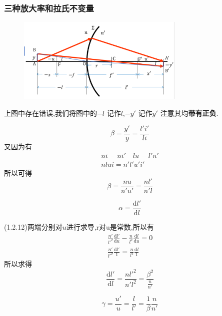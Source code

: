 \subsubsection{三种放大率和拉氏不变量}
        \begin{figure}[H]
            \centering
            \includegraphics[width=8cm]{img/1.3.png}
            \end{figure}
上图中存在错误,我们将图中的$-l$ 记作$l$,$-y'$ 记作$y'$ 注意其均\textbf{带有正负}.
\begin{description}[leftmargin=0.7cm,style=nextline,nosep]%
    \item[横向放大率] 
     \begin{equation}
     \beta=\frac{y'}{y}=\frac{l'i'}{li}\tag{1.2.20}
     \end{equation}
     又因为有
\begin{align}
    ni=ni' \quad lu=l'u' \tag{1.2.21.bre 1}\\
        nlui=n'l'u'i'  \tag{1.2.21.bre 2}
\end{align}
所以可得
\begin{equation}
\beta=\frac{nu}{n'u'}=\frac{nl'}{n'l} \tag{1.2.21}
\end{equation}
    \item[横向(垂轴)放大率] 
    \begin{equation}
    \alpha=\frac{\mathrm{d}{ l'}}{\mathrm{d}{l}}
    \end{equation}
    \item[轴向放大率] (1.2.12)两端分别对$u$进行求导,r对u是常数,所以有
    \begin{align}
      \frac{n'}{l'^2}\frac{\mathrm{d}{l'}}{\mathrm{d}{u}}-\frac{n}{l^2}\frac{\mathrm{d}{l}}{\mathrm{d}{u}}=0 \tag{1.2.22.bef 1}\\ 
      \frac{n'}{l'^2}\frac{\mathrm{d}{l'}}{1}=\frac{n}{l^2}\frac{\mathrm{d}{l}}{1}\tag{1.2.22.bef 1}
    \end{align}
    所以求得
    \begin{equation}
    \frac{\mathrm{d}{l'}}{\mathrm{d}{l}}=\frac{nl'^2}{n'l^2}=\frac{\beta^2}{\frac{n}{n'}} \tag{1.2.22}
    \end{equation}
    \item[角放大率]
    \begin{equation}
    \gamma=\frac{u'}{u}=\frac{l}{l'}=\frac{1}{\beta}\frac{n}{n'} \tag{1.2.23}
    \end{equation} 
\end{description}
